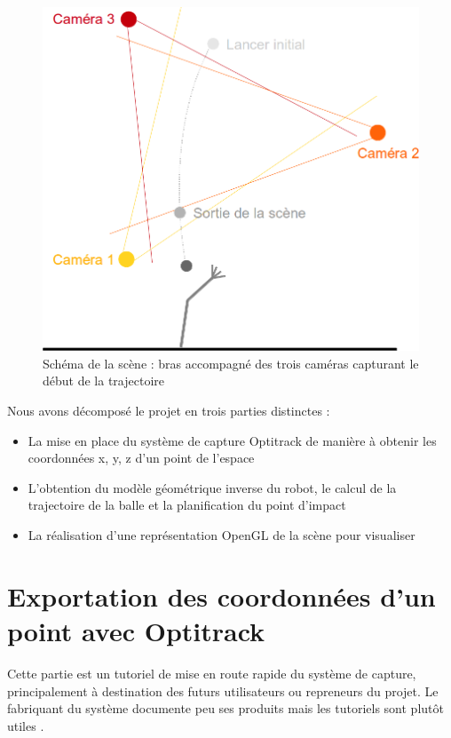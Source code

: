 \documentclass{article}[11pt]
\begin{document}
\begin{figure}[!htc]
	\begin{center}
		\includegraphics[scale=0.5]{images/general.png}
		\caption{Schéma de la scène : bras accompagné des trois caméras capturant le début de la trajectoire} 
		\label{general}
	\end{center}
\end{figure}

Nous avons décomposé le projet en trois parties distinctes :
\begin{itemize}
\item La mise en place du système de capture Optitrack de manière à obtenir les coordonnées x, y, z d'un point de l'espace
\item L'obtention du modèle géométrique inverse du robot, le calcul de la trajectoire de la balle et la planification du point d'impact
\item La réalisation d'une représentation OpenGL de la scène pour visualiser 
\end{itemize}

\section{Exportation des coordonnées d'un point avec Optitrack}

Cette partie est un tutoriel de mise en route rapide du système de capture, principalement à destination des futurs utilisateurs ou repreneurs du projet. Le fabriquant du système documente peu ses produits mais les tutoriels sont plutôt utiles \cite{naturalpoint_tutoriels}. \\
\end{document}
